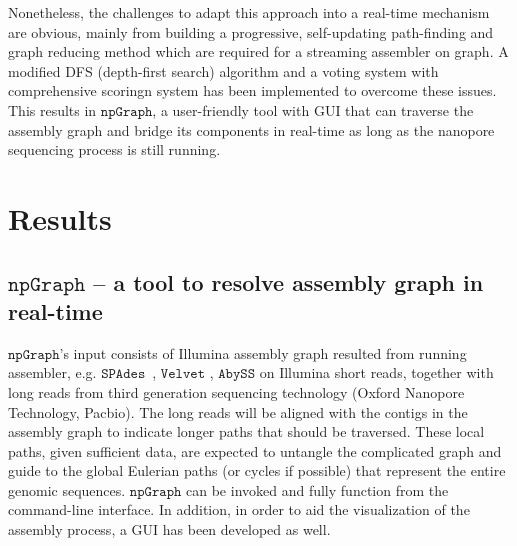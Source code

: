 \documentclass[10pt,twocolumn,twoside]{genpaper}
\newcommand{\npgraph}{$\mathtt{npGraph}$}
\newcommand{\spades}{$\mathtt{SPAdes}$}
\begin{document}
Nonetheless, the challenges to adapt this approach into a real-time mechanism are obvious, mainly from building a progressive, self-updating path-finding and graph reducing method which are required for a streaming assembler on graph. 
A modified DFS (depth-first search) algorithm and a voting system with comprehensive scoringn system has been implemented to overcome these issues.
This results in \npgraph{}, a user-friendly tool with GUI that can traverse the assembly graph and bridge its components in real-time as long as the nanopore sequencing process is still running.  
\section*{Results}
\subsection*{\npgraph{} -- a tool to resolve assembly graph in real-time}
\npgraph{}'s input consists of Illumina assembly graph resulted from running assembler, e.g. \spades{}~\cite{BankevichNA2012}, $\mathtt{Velvet}$ \cite{Zerbino2008}, $\mathtt{AbySS}$ \cite{Simpson2009} on Illumina short reads, together with long reads from third generation sequencing technology (Oxford Nanopore Technology, Pacbio).
The long reads will be aligned with the contigs in the assembly graph to indicate longer paths that should be traversed. These local paths, given sufficient data, are expected to untangle the complicated graph and guide to the global Eulerian paths (or cycles if possible) that represent the entire genomic sequences. 
\npgraph{} can be invoked and fully function from the command-line interface. In addition, in order to aid the visualization of the assembly process, a GUI has been developed as well.
\end{document}
